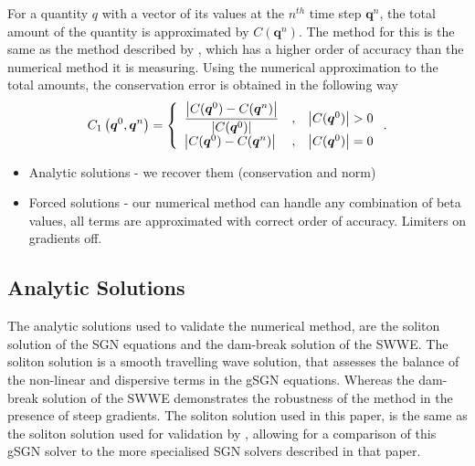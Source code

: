 \documentclass[10pt]{elsarticle}
\newcommand\T{\rule{0pt}{3ex }}       %
\newcommand{\vecn}[1]{\boldsymbol{#1}}
\begin{document}
For a quantity $q$ with a vector of its values at the $n^{th}$ time step $\vecn{q}^n$, the total amount of the quantity is approximated by $C(\vecn{q}^n)$. The method for this is the same as the method described by \citet{Zoppou-etal-2017}, which has a higher order of accuracy than the numerical method it is measuring. Using the numerical approximation to the total amounts, the conservation error is obtained in the following way
\begin{equation}
\label{eqn:Cons_Error}
C_1\left(\vecn{q}^0,\vecn{q}^n\right) = \left \lbrace \begin{array}{l c r}
\dfrac{\left | C(\vecn{q}^0) - C(\vecn{q}^n) \right |}{\left| C(\vecn{q}^0) \right|}&,& \left| C(\vecn{q}^0) \right| > 0 \T \\
\left | C(\vecn{q}^0) - C(\vecn{q}^n) \right |&,& \left| C(\vecn{q}^0) \right| = 0 
\end{array} \right. .
\end{equation}

\begin{itemize}
	\item Analytic solutions - we recover them (conservation and norm)
	\item Forced solutions - our numerical method can handle any combination of beta values, all terms are approximated with correct order of accuracy. Limiters on gradients off. 
\end{itemize}

\subsection{Analytic Solutions}
The analytic solutions used to validate the numerical method, are the soliton solution of the SGN equations and the dam-break solution of the SWWE. The soliton solution is a smooth travelling wave solution, that assesses the balance of the non-linear and dispersive terms in the gSGN equations. Whereas the dam-break solution of the SWWE demonstrates the robustness of the method in the presence of steep gradients. The soliton solution used in this paper, is the same as the soliton solution used for validation by \citet{Pitt-2019}, allowing for a comparison of this gSGN solver to the more specialised SGN solvers described in that paper. 
\end{document}
